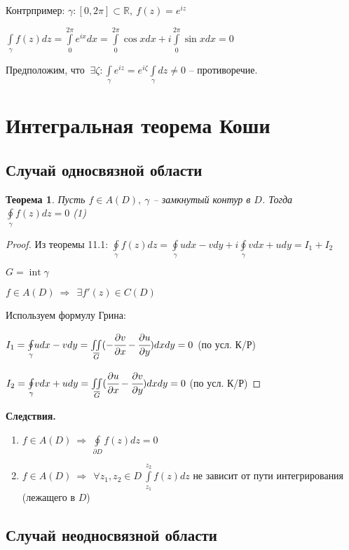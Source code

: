\documentclass[final]{report}
\newcommand{\dd}{\partial}
\newcommand{\then}{\ \Rightarrow\ }
\newcommand{\R}{\mathbb{R}}
\newcommand{\mint}[2]{\underset{#1}{\overset{#2}{\int}}}
\newcommand{\moint}[1]{\underset{#1}{\oint}}
\renewcommand{\bar}{\overline}
\newcommand{\Int}{\mathop{\mathrm{int}}\nolimits}
\newcommand{\g}{\gamma}
\newcommand{\E}{\ \exists}
\newcommand{\F}{\ \forall}
\newtheorem*{theor}{Теорема}
\theoremstyle{remark}
\begin{document}
Контрпример: $\g\colon[0,2\pi]\subset\R,\ f(z)=e^{iz}$

$\mint{\g}{}f(z)dz=\mint{0}{2\pi}e^{ix}dx=\mint{0}{2\pi}\cos xdx+i\mint{0}{2\pi}\sin xdx=0$

Предположим, что $\E\zeta\colon\mint{\g}{}e^{iz}=e^{i\zeta}\mint{\g}{}dz\neq0$ -- противоречие.

\newpage

\section{Интегральная теорема Коши}

\subsection{Случай односвязной области}

\begin{theor}
Пусть $f\in A(D),\ \g$ -- замкнутый контур в $D$. Тогда $\moint\g f(z)dz=0$ (1)
\end{theor}
\begin{proof}
Из теоремы 11.1: $\moint\g f(z)dz=\moint\g udx-vdy+i\moint\g vdx+udy=I_1+I_2$

$G=\Int \g$

$f\in A(D)\then \E f'(z)\in C(D)$

Используем формулу Грина:

$I_1=\moint\g udx-vdy=\underset{\bar{G}}{\iint}(-\cfrac{\dd v}{\dd x}-\cfrac{\dd u}{\dd y})dxdy=0$ (по усл. К/Р)

$I_2=\moint\g vdx+udy=\underset{\bar{G}}{\iint}(\cfrac{\dd u}{\dd x}-\cfrac{\dd v}{\dd y})dxdy=0$ (по усл. К/Р)
\end{proof}

{\bfseries Следствия.}
\begin{enumerate}
\item $f\in A(D)\then\moint{\dd D}f(z)dz=0$
\item $f\in A(D)\then\F z_1,z_2\in D\  \mint{z_1}{z_2}f(z)dz$ не зависит от пути интегрирования (лежащего в $D$)
\end{enumerate}

\subsection{Случай неодносвязной области}
\end{document}
